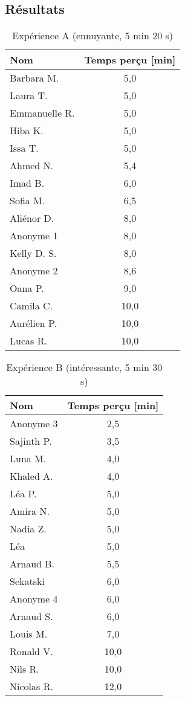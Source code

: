\documentclass[12pt,fleqn,oneside,openany]{book} %
\begin{document}

\subsection{Résultats} \label{ssec:resultats1}

\begin{table}[h]
	\centering
	\caption{Expérience A (ennuyante, 5 min 20 s)} \label{tbl:exp1.1}
	\begin{tabular}{lc}
		\toprule 
		\textbf{Nom} & \textbf{Temps perçu} \textbf{[min]}\\ \midrule
		Barbara M. & 5,0 \\
		Laura T. & 5,0 \\
		Emmanuelle R. & 5,0 \\
		Hiba K. & 5,0 \\
		Issa T. & 5,0 \\
		Ahmed N. & 5,4 \\
		Imad B. & 6,0 \\
		Sofia M. & 6,5 \\
		Aliénor D. & 8,0 \\
		Anonyme 1 & 8,0 \\
		Kelly D. S. & 8,0 \\
		Anonyme 2 & 8,6 \\
		Oana P. & 9,0 \\
		Camila C. & 10,0 \\
		Aurélien P. & 10,0 \\
		Lucas R. & 10,0 \\ \bottomrule
	\end{tabular}
\end{table}

\begin{table}[h]
	\centering
	\caption{Expérience B (intéressante, 5 min 30 s)} \label{tbl:exp1.1}
	\begin{tabular}{lc}
		\toprule
		\textbf{Nom} & \textbf{Temps perçu [min]} \\ \midrule
		Anonyme 3 & 2,5 \\
		Sajinth P. & 3,5 \\
		Luna M. & 4,0 \\
		Khaled A. & 4,0 \\
		Léa P. & 5,0 \\
		Amira N. & 5,0 \\
		Nadia Z. & 5,0 \\
		Léa & 5,0 \\
		Arnaud B. & 5,5 \\
		Sekatski & 6,0 \\
		Anonyme 4 & 6,0 \\
		Arnaud S. & 6,0 \\
		Louis M. & 7,0 \\
		Ronald V. & 10,0 \\
		Nils R. & 10,0 \\
		Nicolas R. & 12,0 \\ \bottomrule
	\end{tabular}
\end{table}
\end{document}
